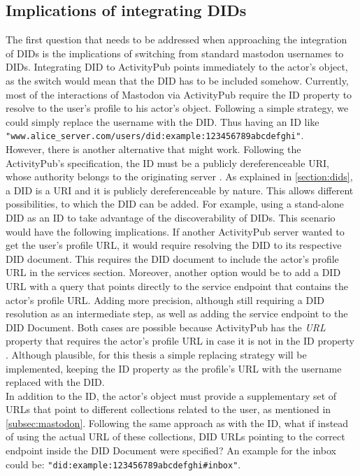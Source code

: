 \subsection{Implications of integrating DIDs}
The first question that needs to be addressed when approaching the integration of DIDs is the implications of switching from standard mastodon usernames to DIDs. Integrating DID to ActivityPub points immediately to the actor's object, as the switch would mean that the DID has to be included somehow. Currently, most of the interactions of Mastodon via ActivityPub require the ID property to resolve to the user's profile to his actor's object. Following a simple strategy, we could simply replace the username with the DID. Thus having an ID like \verb|"www.alice_server.com/users/did:example:123456789abcdefghi"|.\\
However, there is another alternative that might work. Following the ActivityPub's specification, the ID must be a publicly dereferenceable URI, whose authority belongs to the originating server \cite{lemmer-webber_tallon_guy_prodromou_2018}. As explained in \autoref{section:dids}, a DID is a URI and it is publicly dereferenceable by nature. This allows different possibilities, to which the DID can be added. For example, using a stand-alone DID as an ID to take advantage of the discoverability of DIDs. This scenario would have the following implications. If another ActivityPub server wanted to get the user's profile URL, it would require resolving the DID to its respective DID document. This requires the DID document to include the actor's profile URL in the services section. Moreover, another option would be to add a DID URL with a query that points directly to the service endpoint that contains the actor's profile URL. Adding more precision, although still requiring a DID resolution as an intermediate step, as well as adding the service endpoint to the DID Document. Both cases are possible because ActivityPub has the \emph{URL} property that requires the actor's profile URL in case it is not in the ID property \cite{lemmer-webber_tallon_guy_prodromou_2018}. Although plausible, for this thesis a simple replacing strategy will be implemented, keeping the ID property as the profile's URL with the username replaced with the DID. \\
In addition to the ID, the actor's object must provide a supplementary set of URLs that point to different collections related to the user, as mentioned in \autoref{subsec:mastodon}. Following the same approach as with the ID, what if instead of using the actual URL of these collections, DID URLs pointing to the correct endpoint inside the DID Document were specified? An example for the inbox could be: \verb|"did:example:123456789abcdefghi#inbox"|.

